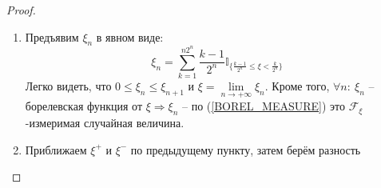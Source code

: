 \begin{proof}
	\begin{enumerate}
		\item Предъявим $\xi_n$ в явном виде:
		      \[\xi_n = \sum_{k = 1}^{n2^n}\frac{k - 1}{2^n}\mathbb{I}_{\{\frac{k - 1}{2^n} \leq \xi < \frac{k}{2^n}\}}\]
		      Легко видеть, что $0 \leq \xi_n \leq \xi_{n + 1}$ и $\xi = \lim\limits_{n \to +\infty} \xi_n$. Кроме того, $\forall n:\: \xi_n$ -- борелевская функция от $\xi \Rightarrow \xi_n$ -- по (\ref{BOREL_MEASURE}) это $\mathcal{F}_\xi$-измеримая случайная величина.
		\item Приближаем $\xi^+$ и $\xi^-$ по предыдущему пункту, затем берём разность
	\end{enumerate}
\end{proof}
